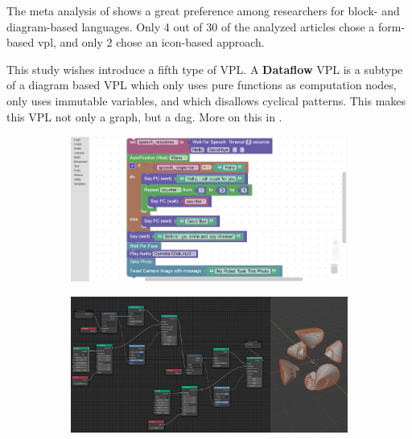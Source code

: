 The meta analysis of \cite{kuhail_characterizing_2021} shows a great preference among researchers for block- and diagram-based languages. 
Only 4 out of 30 of the analyzed articles chose a form-based vpl, and only 2 chose an icon-based approach.  

This study wishes introduce a fifth type of VPL. 
A \textbf{Dataflow} VPL is a subtype of a diagram based VPL which only uses pure functions as computation nodes, only uses immutable variables, and which disallows cyclical patterns. This makes this VPL not only a graph, but a \ac{dag}.
More on this in .

\begin{figure}
\centering
\begin{subfigure}[b]{0.45\linewidth}
  \graphicspath{{../../assets/images/background/vpl/}}
  \centering
  \includegraphics[width=\linewidth]{block-based.png}
  \caption{}\label{fig:vpl-types:1}
\end{subfigure}%
\qquad %
\begin{subfigure}[b]{0.45\linewidth}
  \graphicspath{{../../assets/images/background/vpl/}}
  \centering
  \includegraphics[width=\linewidth]{diagram-based.jpg}
  \caption{}\label{fig:vpl-types:2}

\end{subfigure}
\end{figure}
